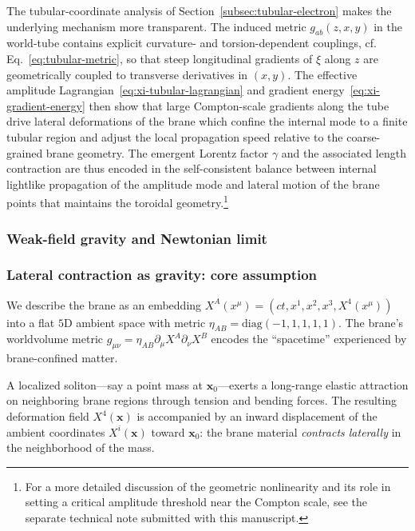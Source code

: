 The tubular-coordinate analysis of Section~\ref{subsec:tubular-electron}
makes the underlying mechanism more transparent.
The induced metric $g_{ab}(z,x,y)$ in the world-tube contains explicit
curvature- and torsion-dependent couplings, cf.
Eq.~\eqref{eq:tubular-metric}, so that steep longitudinal gradients of
$\xi$ along $z$ are geometrically coupled to transverse derivatives in
$(x,y)$. The effective amplitude Lagrangian~\eqref{eq:xi-tubular-lagrangian}
and gradient energy~\eqref{eq:xi-gradient-energy} then show that
large Compton-scale gradients along the tube drive lateral
deformations of the brane which confine the internal mode to a finite
tubular region and adjust the local propagation speed relative to the
coarse-grained brane geometry. The emergent Lorentz factor $\gamma$
and the associated length contraction are thus encoded in the
self-consistent balance between internal lightlike propagation of the
amplitude mode and lateral motion of the brane points that maintains
the toroidal geometry.\footnote{For a more detailed discussion of the
geometric nonlinearity and its role in setting a critical amplitude
threshold near the Compton scale, see the separate technical note
submitted with this manuscript.}

\subsubsection{Weak-field gravity and Newtonian limit}
\label{subsec:weak_field_gravity}

\subsubsection*{Lateral contraction as gravity: core assumption}

We describe the brane as an embedding
$X^A(x^\mu) = (ct, x^1,x^2,x^3, X^4(x^\mu))$
into a flat $5$D ambient space with metric $\eta_{AB}=\mathrm{diag}(-1,1,1,1,1)$.
The brane's worldvolume metric $g_{\mu\nu}=\eta_{AB}\partial_\mu X^A \partial_\nu X^B$ encodes the ``spacetime'' experienced by brane-confined matter.

A localized soliton---say a point mass at $\mathbf x_0$---exerts a long-range elastic attraction on neighboring brane regions through tension and bending forces. The resulting deformation field $X^4(\mathbf x)$ is accompanied by an inward displacement of the ambient coordinates $X^i(\mathbf x)$ toward $\mathbf x_0$: the brane material \emph{contracts laterally} in the neighborhood of the mass.

